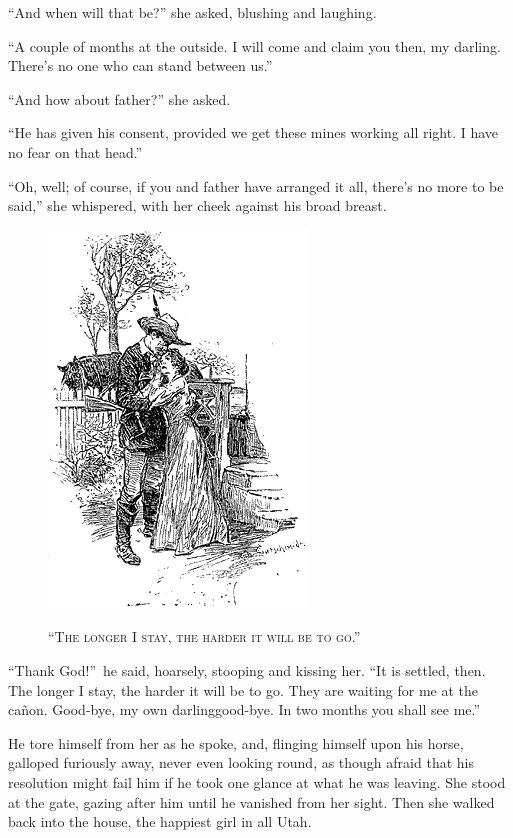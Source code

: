 \documentclass[12pt,english]{book}
\newcommand{\noun}[1]{\textsc{#1}}
\begin{document}
{}``And when will that be?'' she asked, blushing and laughing.

{}``A couple of months at the outside. I will come and claim you
then, my darling. There's no one who can stand between us.''

{}``And how about father?'' she asked.

{}``He has given his consent, provided we get these mines working
all right. I have no fear on that head.''

{}``Oh, well; of course, if you and father have arranged it all,
there's no more to be said,'' she whispered, with her cheek against
his broad breast.

%
\begin{figure}[htbp]
\noindent \begin{center}\includegraphics{images/study10-stud-17.png}\end{center}

\noindent \begin{center}\noun{{}``The longer I stay, the harder
it will be to go.''}\end{center}
\end{figure}
{}``Thank God!''\ he said, hoarsely, stooping and kissing her.
{}``It is settled, then. The longer I stay, the harder it will be
to go. They are waiting for me at the ca\~{n}on. Good-bye, my own darling\mdsh{---}good-bye.
In two months you shall see me.''

He tore himself from her as he spoke, and, flinging himself upon his
horse, galloped furiously away, never even looking round, as though
afraid that his resolution might fail him if he took one glance at
what he was leaving. She stood at the gate, gazing after him until
he vanished from her sight. Then she walked back into the house, the
happiest girl in all Utah.
\end{document}
